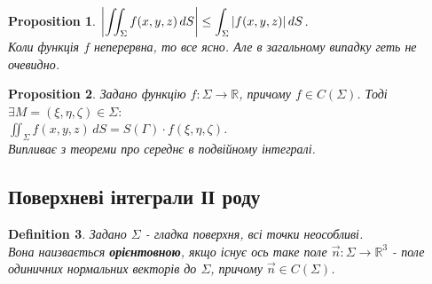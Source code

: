 \documentclass[a4paper, 10pt]{article}
\theoremstyle{theoremdd}
\newtheorem{theorem}{Theorem}[subsection]
\theoremstyle{theoremdd}
\newtheorem{definition}[theorem]{Definition}
\theoremstyle{theoremdd}
\theoremstyle{theoremdd}
\theoremstyle{theoremdd}
\newtheorem{proposition}[theorem]{Proposition}
\theoremstyle{theoremdd}
\theoremstyle{theoremdd}
\theoremstyle{theoremdd}
\newtheorem{corollary}[theorem]{Corollary}
\begin{document}
\begin{proposition}
$\displaystyle \abs{\iint_\Sigma f(x,y,z)\,dS} \leq \int_\Sigma |f(x,y,z)|\,dS$.\\
\textit{Коли функція $f$ неперервна, то все ясно. Але в загальному випадку геть не очевидно.}
\end{proposition}

\begin{proposition}
Задано функцію $f: \Sigma \to \mathbb{R}$, причому $f \in C(\Sigma)$. Тоді $\exists M = (\xi,\eta,\zeta) \in \Sigma:$\\
$\displaystyle\iint_\Sigma f(x,y,z)\,dS = S(\Gamma) \cdot f(\xi,\eta,\zeta)$.\\
\textit{Випливає з теореми про середнє в подвійному інтегралі.}
\end{proposition}

\subsection{Поверхневі інтеграли ІІ роду}
\begin{definition}
Задано $\Sigma$ - гладка поверхня, всі точки неособливі.\\
Вона наизвається \textbf{орієнтовною}, якщо існує ось таке поле $\vec{n}: \Sigma \to \mathbb{R}^3$ - поле одиничних нормальних векторів до $\Sigma$, причому $\vec{n} \in C(\Sigma)$.
\end{definition}
\end{document}

